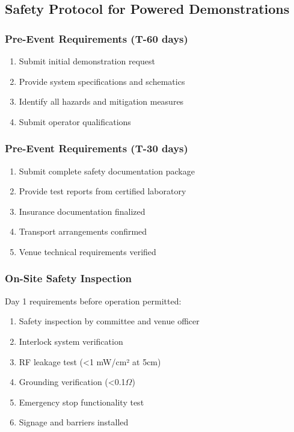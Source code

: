 \subsection{Safety Protocol for Powered Demonstrations}

\subsubsection{Pre-Event Requirements (T-60 days)}
\begin{enumerate}[noitemsep]
    \item Submit initial demonstration request
    \item Provide system specifications and schematics
    \item Identify all hazards and mitigation measures
    \item Submit operator qualifications
\end{enumerate}

\subsubsection{Pre-Event Requirements (T-30 days)}
\begin{enumerate}[noitemsep]
    \item Submit complete safety documentation package
    \item Provide test reports from certified laboratory
    \item Insurance documentation finalized
    \item Transport arrangements confirmed
    \item Venue technical requirements verified
\end{enumerate}

\subsubsection{On-Site Safety Inspection}
Day 1 requirements before operation permitted:
\begin{enumerate}[noitemsep]
    \item Safety inspection by committee and venue officer
    \item Interlock system verification
    \item RF leakage test (<1 mW/cm² at 5cm)
    \item Grounding verification (<0.1$\Omega$)
    \item Emergency stop functionality test
    \item Signage and barriers installed
\end{enumerate}

